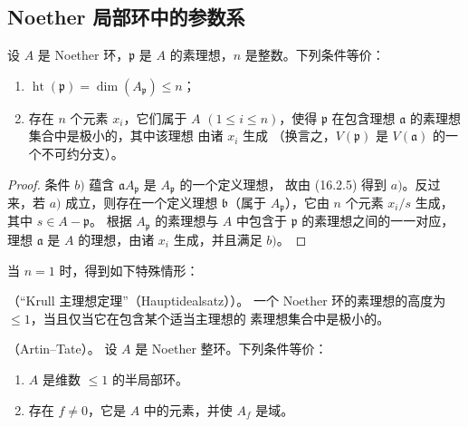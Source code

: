 \subsection{Noether 局部环中的参数系}
\label{subsection:0.16.3-fr}

\begin{proposition}[16.3.1]
\label{0.16.3.1-fr}
设 $A$ 是 Noether 环，$\mathfrak{p}$ 是 $A$ 的素理想，$n$ 是整数。下列条件等价：
\begin{enumerate}
  \item[$a)$] $\operatorname{ht}(\mathfrak{p})=
  \dim(A_{\mathfrak{p}})\leq n$；
  \item[$b)$] 存在 $n$ 个元素 $x_i$，它们属于 $A$ $(1\leq i\leq n)$，使得
  $\mathfrak{p}$ 在包含理想 $\mathfrak{a}$ 的素理想集合中是极小的，其中该理想
  由诸 $x_i$ 生成
  （换言之，$V(\mathfrak{p})$ 是 $V(\mathfrak{a})$ 的一个不可约分支）。
\end{enumerate}
\end{proposition}

\begin{proof}
条件 $b)$ 蕴含 $\mathfrak{a}A_{\mathfrak{p}}$ 是 $A_{\mathfrak{p}}$ 的一个定义理想，
故由 (16.2.5) 得到 $a)$。反过来，若 $a)$ 成立，则存在一个定义理想
$\mathfrak{b}$（属于 $A_{\mathfrak{p}}$），它由 $n$ 个元素 $x_i/s$ 生成，其中
$s\in A-\mathfrak{p}$。
根据 $A_{\mathfrak{p}}$ 的素理想与 $A$ 中包含于 $\mathfrak{p}$ 的素理想之间的一一对应，
理想 $\mathfrak{a}$ 是 $A$ 的理想，由诸 $x_i$ 生成，并且满足 $b)$。
\end{proof}


当 $n=1$ 时，得到如下特殊情形：

\begin{corollary}[16.3.2]
\label{0.16.3.2-fr}
\textup{（“Krull 主理想定理”（Hauptidealsatz））。}
一个 Noether 环的素理想的高度为 $\leq1$，当且仅当它在包含某个适当主理想的
素理想集合中是极小的。
\end{corollary}

\begin{corollary}[16.3.3]
\label{0.16.3.3-fr}
\textup{（Artin--Tate）。}
设 $A$ 是 Noether 整环。下列条件等价：
\begin{enumerate}
  \item[$a)$] $A$ 是维数 $\leq1$ 的半局部环。
  \item[$b)$] 存在 $f\neq0$，它是 $A$ 中的元素，并使 $A_f$ 是域。
\end{enumerate}
\end{corollary}

